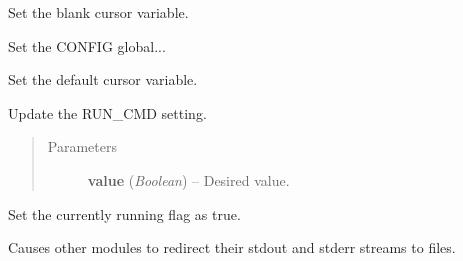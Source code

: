 \documentclass[letterpaper,10pt,english]{sphinxmanual}
\begin{document}
\begin{fulllineitems}
\label{diwavars:diwavars.set_blank_cursor}
Set the blank cursor variable.

\end{fulllineitems}


\begin{fulllineitems}
\label{diwavars:diwavars.set_config}
Set the CONFIG global...

\end{fulllineitems}


\begin{fulllineitems}
\label{diwavars:diwavars.set_default_cursor}
Set the default cursor variable.

\end{fulllineitems}


\begin{fulllineitems}
\label{diwavars:diwavars.set_run_cmd}
Update the RUN\_CMD setting.
\begin{quote}\begin{description}
\item[{Parameters}] \leavevmode
\textbf{value} (\emph{Boolean}) -- Desired value.

\end{description}\end{quote}

\end{fulllineitems}


\begin{fulllineitems}
\label{diwavars:diwavars.set_running}
Set the currently running flag as true.

Causes other modules to redirect their stdout and stderr streams
to files.

\end{fulllineitems}
\end{document}
